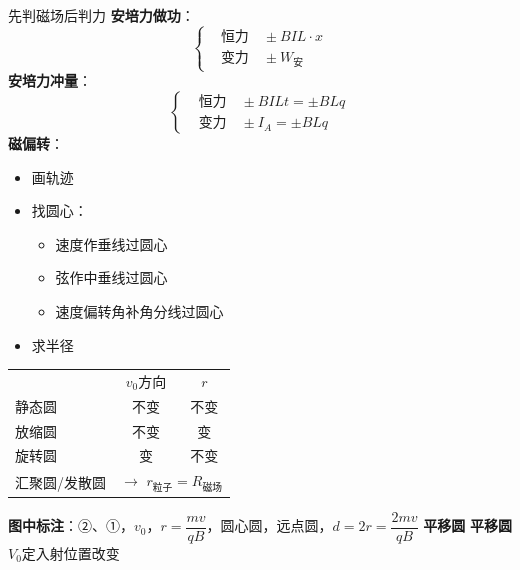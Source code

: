 先判磁场后判力
\textbf{安培力做功}：
\[
\left\{\begin{aligned}
&\text{恒力}\quad \pm BIL\cdot x\\
&\text{变力}\quad \pm W_{\text{安}}
\end{aligned}\right.
\]
\textbf{安培力冲量}：
\[
\left\{\begin{aligned}
&\text{恒力}\quad \pm BILt=\pm BLq\\
&\text{变力}\quad \pm I_{A}=\pm BLq
\end{aligned}\right.
\]
\textbf{磁偏转}：
\begin{itemize}
\item 画轨迹
\item 找圆心：
\begin{itemize}
\item 速度作垂线过圆心
\item 弦作中垂线过圆心
\item 速度偏转角补角分线过圆心
\end{itemize}
\item 求半径
\end{itemize}
\begin{center}
\begin{tabular}{lcc}
 & $v_0$方向 & $r$\\
静态圆 & 不变 & 不变\\
放缩圆 & 不变 & 变\\
旋转圆 & 变 & 不变\\
汇聚圆/发散圆 & \multicolumn{2}{l}{$\to$ $r_{\text{粒子}}=R_{\text{磁场}}$}
\end{tabular}
\end{center}
\textbf{图中标注}：②、①，$v_0$，$r=\dfrac{mv}{qB}$，圆心圆，远点圆，$d=2r=\dfrac{2mv}{qB}$
\textbf{平移圆}
\textbf{平移圆}\quad $V_0$定\quad 入射位置改变
